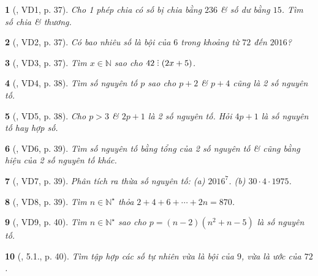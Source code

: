 \documentclass{article}
\newtheorem{baitoan}{}
\DeclareRobustCommand{\divby}{%
	\mathrel{\vbox{\baselineskip.65ex\lineskiplimit0pt\hbox{.}\hbox{.}\hbox{.}}}%
}
\begin{document}
\begin{baitoan}[\cite{Binh_boi_duong_Toan_6_tap_1}, VD1, p. 37]
	Cho 1 phép chia có số bị chia bằng $236$ \& số dư bằng $15$. Tìm số chia \& thương.
\end{baitoan}

\begin{baitoan}[\cite{Binh_boi_duong_Toan_6_tap_1}, VD2, p. 37]
	Có bao nhiêu số là bội của $6$ trong khoảng từ $72$ đến $2016$?
\end{baitoan}

\begin{baitoan}[\cite{Binh_boi_duong_Toan_6_tap_1}, VD3, p. 37]
	Tìm $x\in\mathbb{N}$ sao cho $42\divby(2x + 5)$.
\end{baitoan}

\begin{baitoan}[\cite{Binh_boi_duong_Toan_6_tap_1}, VD4, p. 38]
	Tìm số nguyên tố $p$ sao cho $p + 2$ \& $p + 4$ cũng là 2 số nguyên tố.
\end{baitoan}

\begin{baitoan}[\cite{Binh_boi_duong_Toan_6_tap_1}, VD5, p. 38]
	Cho $p > 3$ \& $2p + 1$ là 2 số nguyên tố. Hỏi $4p + 1$ là số nguyên tố hay hợp số.
\end{baitoan}

\begin{baitoan}[\cite{Binh_boi_duong_Toan_6_tap_1}, VD6, p. 39]
	Tìm số nguyên tố bằng tổng của 2 số nguyên tố \& cũng bằng hiệu của 2 số nguyên tố khác.
\end{baitoan}

\begin{baitoan}[\cite{Binh_boi_duong_Toan_6_tap_1}, VD7, p. 39]
	Phân tích ra thừa số nguyên tố: (a) $2016^7$. (b) $30\cdot4\cdot1975$.
\end{baitoan}

\begin{baitoan}[\cite{Binh_boi_duong_Toan_6_tap_1}, VD8, p. 39]
	Tìm $n\in\mathbb{N}^\star$ thỏa $2 + 4 + 6 + \cdots + 2n = 870$.
\end{baitoan}

\begin{baitoan}[\cite{Binh_boi_duong_Toan_6_tap_1}, VD9, p. 40]
	Tìm $n\in\mathbb{N}^\star$ sao cho $p = (n - 2)(n^2 + n - 5)$ là số nguyên tố.
\end{baitoan}

\begin{baitoan}[\cite{Binh_boi_duong_Toan_6_tap_1}, 5.1., p. 40]
	Tìm tập hợp các số tự nhiên vừa là bội của $9$, vừa là ước của $72$.
\end{baitoan}
\end{document}

